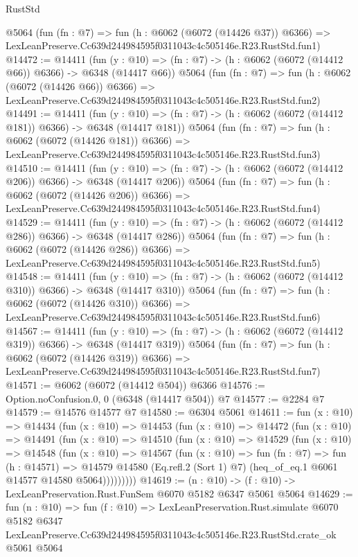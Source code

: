 \begin{lexlean}{RustStd}
\begin{coremodule}
    @5064
    (fun (fn : @7) =>
    fun (h : @6062 (@6072 (@14426 @37)) @6366) =>
    LexLeanPreserve.Cc639d244984595f0311043c4c505146e.R23.RustStd.fun1)
@14472 := @14411
    (fun (y : @10) => (fn : @7) -> (h : @6062 (@6072 (@14412 @66)) @6366) -> @6348 (@14417 @66))
    @5064
    (fun (fn : @7) =>
    fun (h : @6062 (@6072 (@14426 @66)) @6366) =>
    LexLeanPreserve.Cc639d244984595f0311043c4c505146e.R23.RustStd.fun2)
@14491 := @14411
    (fun (y : @10) => (fn : @7) -> (h : @6062 (@6072 (@14412 @181)) @6366) -> @6348 (@14417 @181))
    @5064
    (fun (fn : @7) =>
    fun (h : @6062 (@6072 (@14426 @181)) @6366) =>
    LexLeanPreserve.Cc639d244984595f0311043c4c505146e.R23.RustStd.fun3)
@14510 := @14411
    (fun (y : @10) => (fn : @7) -> (h : @6062 (@6072 (@14412 @206)) @6366) -> @6348 (@14417 @206))
    @5064
    (fun (fn : @7) =>
    fun (h : @6062 (@6072 (@14426 @206)) @6366) =>
    LexLeanPreserve.Cc639d244984595f0311043c4c505146e.R23.RustStd.fun4)
@14529 := @14411
    (fun (y : @10) => (fn : @7) -> (h : @6062 (@6072 (@14412 @286)) @6366) -> @6348 (@14417 @286))
    @5064
    (fun (fn : @7) =>
    fun (h : @6062 (@6072 (@14426 @286)) @6366) =>
    LexLeanPreserve.Cc639d244984595f0311043c4c505146e.R23.RustStd.fun5)
@14548 := @14411
    (fun (y : @10) => (fn : @7) -> (h : @6062 (@6072 (@14412 @310)) @6366) -> @6348 (@14417 @310))
    @5064
    (fun (fn : @7) =>
    fun (h : @6062 (@6072 (@14426 @310)) @6366) =>
    LexLeanPreserve.Cc639d244984595f0311043c4c505146e.R23.RustStd.fun6)
@14567 := @14411
    (fun (y : @10) => (fn : @7) -> (h : @6062 (@6072 (@14412 @319)) @6366) -> @6348 (@14417 @319))
    @5064
    (fun (fn : @7) =>
    fun (h : @6062 (@6072 (@14426 @319)) @6366) =>
    LexLeanPreserve.Cc639d244984595f0311043c4c505146e.R23.RustStd.fun7)
@14571 := @6062 (@6072 (@14412 @504)) @6366
@14576 := Option.noConfusion.{0, 0} (@6348 (@14417 @504)) @7
@14577 := @2284 @7
@14579 := @14576 @14577 @7
@14580 := @6304 @5061
@14611 := fun (x : @10) =>
  @14434
    (fun (x : @10) =>
    @14453
      (fun (x : @10) =>
      @14472
        (fun (x : @10) =>
        @14491
          (fun (x : @10) =>
          @14510
            (fun (x : @10) =>
            @14529
              (fun (x : @10) =>
              @14548
                (fun (x : @10) =>
                @14567
                  (fun (x : @10) =>
                  fun (fn : @7) =>
                  fun (h : @14571) =>
                  @14579
                    @14580
                    (Eq.refl.{2} (Sort 1) @7)
                    (heq_of_eq.{1} @6061 @14577 @14580 @5064)))))))))
@14619 := (n : @10) -> (f : @10) -> LexLeanPreservation.Rust.FunSem @6070 @5182 @6347 @5061 @5064
@14629 := fun (n : @10) =>
  fun (f : @10) =>
  LexLeanPreservation.Rust.simulate
    @6070
    @5182
    @6347
    LexLeanPreserve.Cc639d244984595f0311043c4c505146e.R23.RustStd.crate_ok
    @5061
    @5064
\end{coremodule}
\end{lexlean}
